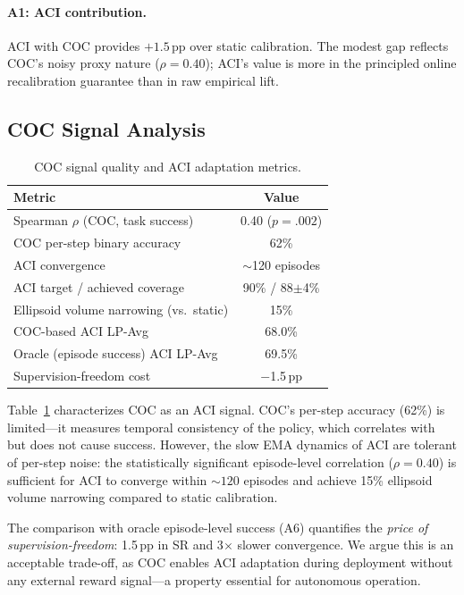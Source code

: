 \documentclass[10pt,twocolumn]{article}
\begin{document}
\paragraph{A1: ACI contribution.}
ACI with COC provides $+1.5$\,pp over static calibration.
The modest gap reflects COC's noisy proxy nature ($\rho{=}0.40$); ACI's value is more in the principled online recalibration guarantee than in raw empirical lift.

\subsection{COC Signal Analysis}

\begin{table}[t]
\centering
\small
\caption{COC signal quality and ACI adaptation metrics.}
\label{tab:coc}
\begin{tabular}{lc}
\toprule
Metric & Value \\
\midrule
Spearman $\rho$ (COC, task success) & 0.40 ($p{=}.002$) \\
COC per-step binary accuracy & 62\% \\
ACI convergence & ${\sim}$120 episodes \\
ACI target / achieved coverage & 90\% / 88$\pm$4\% \\
Ellipsoid volume narrowing (vs.\ static) & 15\% \\
\midrule
COC-based ACI LP-Avg & 68.0\% \\
Oracle (episode success) ACI LP-Avg & 69.5\% \\
Supervision-freedom cost & $-$1.5\,pp \\
\bottomrule
\end{tabular}
\end{table}

Table~\ref{tab:coc} characterizes COC as an ACI signal.
COC's per-step accuracy (62\%) is limited---it measures temporal consistency of the policy, which correlates with but does not cause success.
However, the slow EMA dynamics of ACI are tolerant of per-step noise: the statistically significant episode-level correlation ($\rho{=}0.40$) is sufficient for ACI to converge within ${\sim}120$ episodes and achieve 15\% ellipsoid volume narrowing compared to static calibration.

The comparison with oracle episode-level success (A6) quantifies the \emph{price of supervision-freedom}: 1.5\,pp in SR and 3$\times$ slower convergence.
We argue this is an acceptable trade-off, as COC enables ACI adaptation during deployment without any external reward signal---a property essential for autonomous operation.
\end{document}
